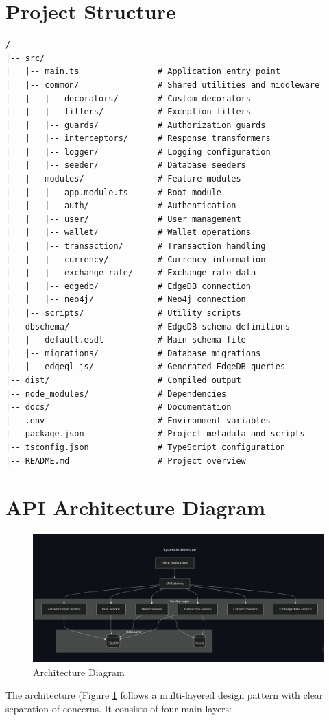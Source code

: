 \section{Project Structure}
\begin{tcolorbox}[width=\textwidth, boxrule=0pt, colback=gray!5, colframe=gray!5, arc=0mm, outer arc=0mm]
\begin{lstlisting}[numbers=none]
/
|-- src/
|   |-- main.ts                # Application entry point
|   |-- common/                # Shared utilities and middleware
|   |   |-- decorators/        # Custom decorators
|   |   |-- filters/           # Exception filters
|   |   |-- guards/            # Authorization guards
|   |   |-- interceptors/      # Response transformers
|   |   |-- logger/            # Logging configuration
|   |   |-- seeder/            # Database seeders
|   |-- modules/               # Feature modules
|   |   |-- app.module.ts      # Root module
|   |   |-- auth/              # Authentication
|   |   |-- user/              # User management
|   |   |-- wallet/            # Wallet operations
|   |   |-- transaction/       # Transaction handling
|   |   |-- currency/          # Currency information
|   |   |-- exchange-rate/     # Exchange rate data
|   |   |-- edgedb/            # EdgeDB connection
|   |   |-- neo4j/             # Neo4j connection
|   |-- scripts/               # Utility scripts
|-- dbschema/                  # EdgeDB schema definitions
|   |-- default.esdl           # Main schema file
|   |-- migrations/            # Database migrations
|   |-- edgeql-js/             # Generated EdgeDB queries
|-- dist/                      # Compiled output
|-- node_modules/              # Dependencies
|-- docs/                      # Documentation
|-- .env                       # Environment variables
|-- package.json               # Project metadata and scripts
|-- tsconfig.json              # TypeScript configuration
|-- README.md                  # Project overview
\end{lstlisting}
\end{tcolorbox}
\section{API Architecture Diagram}
\begin{figure}[h]
    \centering
    \includegraphics[width=\textwidth, keepaspectratio]{figures/architecture diagram.png}
    \caption{Architecture Diagram}
    \label{fig:Architecture Diagram}
\end{figure}
The architecture (Figure \ref{fig:Architecture Diagram} follows a multi-layered design pattern with clear separation of concerns. It consists of four main layers:

